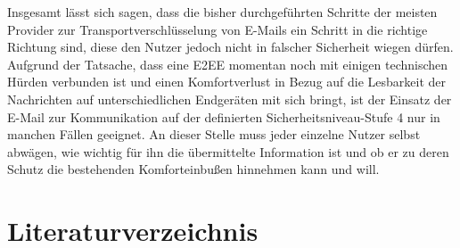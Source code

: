 \documentclass  [paper=a4,
				fontsize=12pt,
				listof=totoc,
				bibliography=totoc
				]{scrreprt}
\begin{document}
		Insgesamt lässt sich sagen, dass die bisher durchgeführten Schritte der meisten Provider zur Transportverschlüsselung von E-Mails ein Schritt in die richtige Richtung sind, diese den Nutzer jedoch nicht in falscher Sicherheit wiegen dürfen.
		Aufgrund der Tatsache, dass eine \ac{E2EE} momentan noch mit einigen technischen Hürden verbunden ist und einen Komfortverlust in Bezug auf die Lesbarkeit der Nachrichten auf unterschiedlichen Endgeräten mit sich bringt, ist der Einsatz der E-Mail zur Kommunikation auf der definierten Sicherheitsniveau-Stufe 4 nur in manchen Fällen geeignet.
		An dieser Stelle muss jeder einzelne Nutzer selbst abwägen, wie wichtig für ihn die übermittelte Information ist und ob er zu deren Schutz die bestehenden Komforteinbußen hinnehmen kann und will.
		
%		
%				
%				
%				
%				
%									
	\chapter*{Literaturverzeichnis}
	\fancyhead{}
	\renewcommand{\headrulewidth}{0pt}	
	\begin{footnotesize}
		\printbibliography[heading=offline,nottype=online]
		\printbibliography[heading=online,type=online]
	\end{footnotesize}
\end{document}
